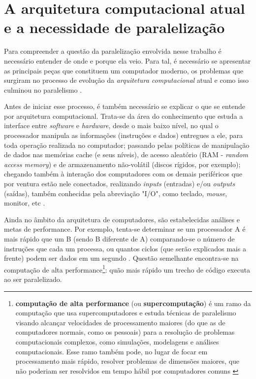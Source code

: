     
\chapter{A arquitetura computacional atual e a necessidade de paralelização}

    Para compreender a questão da paralelização envolvida nesse trabalho é 
    necessário entender de onde e porque ela veio. Para tal, é necessário 
    se apresentar as principais peças que constituem um computador moderno, 
    os problemas que surgiram no processo de evolução da \textit{arquitetura 
    computacional}  atual e como isso culminou no paralelismo \cite{LLNL:parcomp}.

    Antes de iniciar esse processo, é também necessário se explicar o que se 
    entende por arquitetura computacional. Trata-se da área do conhecimento 
    que estuda a interface entre \textit{software} e \textit{hardware}, desde 
    o mais baixo nível, no qual o processador manipula as informações 
    (instruções e dados) entregues a ele, para toda operação realizada no 
    computador; passando pelas políticas de manipulação de dados nas memórias 
    cache (e seus níveis), de acesso aleatório (RAM - \textit{random access 
    memory}) e de armazenamento não-volátil (discos rígidos, por exemplo); 
    chegando também à interação dos computadores com os demais periféricos que 
    por ventura estão nele conectados, realizando \textit{inputs} (entradas) 
    e/ou \textit{outputs} (saídas), também conhecidas pela abreviação "I/O", 
    como teclado, \textit{mouse}, monitor, etc \cite{Catsoulis}.
    
    Ainda no âmbito da arquitetura de computadores, são estabelecidas análises e 
    metas de performance. Por exemplo, tenta-se determinar se um processador A é 
    mais rápido que um B (sendo B diferente de A) comparando-se o número de 
    instruções que cada um processa, ou quantos ciclos (que serão explicados mais 
    a frente) podem ser dados em um segundo \cite{wiki:comparch}. 
    Questão semelhante encontra-se na 
    computação de alta performance\footnote{\textbf{computação de alta performance} 
    (ou \textbf{supercomputação}) é um ramo da computação que usa supercomputadores 
    e estuda técnicas de paralelismo visando alcançar velocidades de processamento 
    maiores (do que as de computadores normais, como os pessoais) para a resolução de 
    problemas computacionais complexos, como simulações, 
    modelagens e análises computacionais. Esse ramo também pode, no lugar de focar 
    em processamento mais rápido, resolver problemas de dimensões maiores, que não 
    poderiam ser resolvidos em tempo hábil por computadores comuns \cite{techo:hpc}}: 
    quão mais rápido um trecho de código executa ao ser paralelizado.
   
